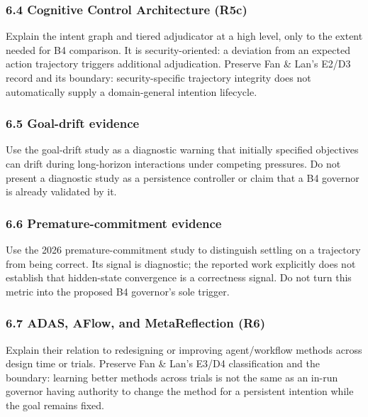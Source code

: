 \subsubsection{6.4 Cognitive Control Architecture (R5c)}\label{cognitive-control-architecture-r5c}

Explain the intent graph and tiered adjudicator at a high level, only to the extent needed for B4 comparison. It is security-oriented: a deviation from an expected action trajectory triggers additional adjudication. Preserve Fan \& Lan's E2/D3 record and its boundary: security-specific trajectory integrity does not automatically supply a domain-general intention lifecycle.\autocite{liang2025cca}

\subsubsection{6.5 Goal-drift evidence}\label{goal-drift-evidence}

Use the goal-drift study as a diagnostic warning that initially specified objectives can drift during long-horizon interactions under competing pressures. Do not present a diagnostic study as a persistence controller or claim that a B4 governor is already validated by it.\autocite{arike2025goaldrift}

\subsubsection{6.6 Premature-commitment evidence}\label{premature-commitment-evidence}

Use the 2026 premature-commitment study to distinguish settling on a trajectory from being correct. Its signal is diagnostic; the reported work explicitly does not establish that hidden-state convergence is a correctness signal. Do not turn this metric into the proposed B4 governor's sole trigger.\autocite{mehta2026premature}

\subsubsection{6.7 ADAS, AFlow, and MetaReflection (R6)}\label{adas-aflow-and-metareflection-r6}

Explain their relation to redesigning or improving agent/workflow methods across design time or trials. Preserve Fan \& Lan's E3/D4 classification and the boundary: learning better methods across trials is not the same as an in-run governor having authority to change the method for a persistent intention while the goal remains fixed.\autocite{hu2024adas,zhang2024aflow,gupta2024metareflection}


